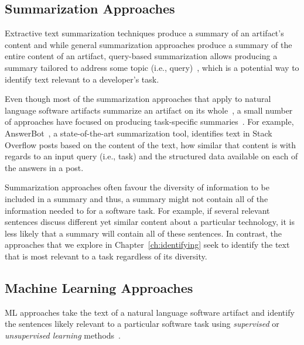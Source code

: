 \subsection{Summarization Approaches}
\label{cp2:summarization}



Extractive text summarization techniques 
produce a summary of an artifact's content
and while general summarization approaches produce a summary of the entire content of an artifact, 
query-based summarization allows 
producing a summary tailored to address some topic (i.e., query)~\cite{Goldsteinet1999}, which is a potential way to identify 
text relevant to a developer's task. 


Even though most of the summarization approaches that apply to natural language software artifacts 
summarize an artifact on its whole~\cite{Rastkar2010, Murray2008, Lotufo2012, Ponzanelli2015},
a small number of approaches have focused on
producing task-specific summaries~\cite{Xu2017, silva2019}.
For example, 
 AnswerBot~\cite{Xu2017},
 a state-of-the-art summarization tool, 
identifies text
in Stack Overflow posts 
based on 
the content of the text, how similar that content is with regards to an input query (i.e., task)
and the structured data available on each of the answers in a post.



Summarization approaches often favour the diversity of information to be included in a summary
and thus, a summary might not contain all of the information needed 
to for a software task.
For example, if several relevant sentences discuss different yet similar content about 
a particular technology, it is less likely that a summary will contain all of these sentences. 
In contrast, the approaches that we explore in Chapter~\ref{ch:identifying}
seek to identify the text that is most relevant to a task regardless 
of its diversity.






\subsection{Machine Learning Approaches}
\label{cp2:machine-learning}


\acf{ML} approaches take the text of a natural language software artifact and identify 
the sentences likely relevant to a particular software task using \textit{supervised} or 
\textit{unsupervised learning} methods~\cite{zhang2005machine}.



